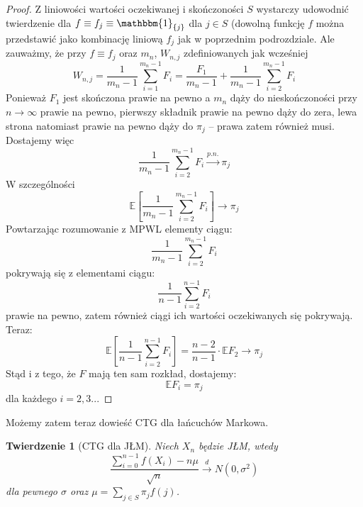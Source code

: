 \documentclass[a4paper]{article}
\theoremstyle{defn}
\theoremstyle{theorem}
\newtheorem{theorem}[defn]{Twierdzenie}
\theoremstyle{lemma}
\theoremstyle{cor}
\theoremstyle{fact}
\begin{document}
\begin{proof} Z liniowości wartości oczekiwanej i skończoności $S$ wystarczy udowodnić twierdzenie dla $f \equiv f_j \equiv \mathbbm{1}_{\{j\}}$ dla $j \in S$ (dowolną funkcję $f$ można przedstawić jako kombinację liniową $f_j$ jak w poprzednim podrozdziale. Ale zauważmy, że przy $f \equiv f_j$ oraz $m_n$, $W_{n, j}$ zdefiniowanych jak wcześniej $$W_{n, j} = \frac{1}{m_n -1}\sum\limits_{i = 1}^{m_n -1} F_i = \frac{F_1}{m_n - 1} + \frac{1}{m_n - 1} \sum\limits_{i = 2}^{m_n - 1} F_i$$
Ponieważ $F_1$ jest skończona prawie na pewno a $m_n$ dąży do nieskończoności przy $n \to \infty$ prawie na pewno, pierwszy składnik prawie na pewno dąży do zera, lewa strona natomiast prawie na pewno dąży do $\pi_j$ – prawa zatem również musi. Dostajemy więc
$$\frac{1}{m_n - 1} \sum\limits_{i = 2}^{m_n - 1} F_i \overset{p.n.}{\to} \pi_j$$
W szczególności
$$\mathbb{E}\left[\frac{1}{m_n - 1} \sum\limits_{i = 2}^{m_n - 1} F_i\right] \to \pi_j$$
Powtarzając rozumowanie z MPWL elementy ciągu:
$$\frac{1}{m_n - 1} \sum\limits_{i = 2}^{m_n - 1} F_i$$
pokrywają się z elementami ciągu:
$$\frac{1}{n - 1} \sum\limits_{i = 2}^{n - 1} F_i$$
prawie na pewno, zatem również ciągi ich wartości oczekiwanych się pokrywają. Teraz:
$$\mathbb{E}\left[\frac{1}{n - 1} \sum\limits_{i = 2}^{n - 1} F_i\right] = \frac{n-2}{n - 1}\cdot \mathbb{E}F_2 \to \pi_j$$
Stąd i z tego, że $F$ mają ten sam rozkład, dostajemy:
$$\mathbb{E}F_i = \pi_j$$
dla każdego $i = 2,3...$
\end{proof}
Możemy zatem teraz dowieść CTG dla łańcuchów Markowa.
\begin{theorem}[CTG dla JŁM]\label{theorem2.6.5}
Niech $X_n$ będzie JŁM, wtedy
$$ \frac{\sum\limits_{i=0}^{n-1} f(X_i) - n\mu}{\sqrt{n}} \overset{d}{\to} N(0, \sigma^2)$$
dla pewnego $\sigma$ oraz $\mu = \sum\limits_{j \in S} \pi_j f(j)$.
\end{theorem}
\end{document}
